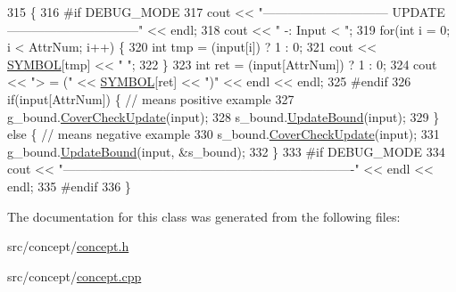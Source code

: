 \begin{DoxyCode}
315                                                     \{
316 \textcolor{preprocessor}{#if DEBUG\_MODE}
317 \textcolor{preprocessor}{}    cout << \textcolor{stringliteral}{"------------------------------ UPDATE --------------------------------"} << endl;
318     cout << \textcolor{stringliteral}{" -: Input < "};
319     \textcolor{keywordflow}{for}(\textcolor{keywordtype}{int} i = 0; i < AttrNum; i++) \{
320     \textcolor{keywordtype}{int} tmp = (input[i]) ? 1 : 0;
321     cout << \hyperlink{concept_8cpp_a6a0fcd5aed2dc21ce5f79cbe7c3a8e2f}{SYMBOL}[tmp] << \textcolor{stringliteral}{" "};
322     \}
323     \textcolor{keywordtype}{int} ret = (input[AttrNum]) ? 1 : 0;
324     cout << \textcolor{stringliteral}{"> = ("} << \hyperlink{concept_8cpp_a6a0fcd5aed2dc21ce5f79cbe7c3a8e2f}{SYMBOL}[ret] << \textcolor{stringliteral}{")"} << endl << endl;
325 \textcolor{preprocessor}{#endif}
326 \textcolor{preprocessor}{}    \textcolor{keywordflow}{if}(input[AttrNum]) \{    \textcolor{comment}{// means positive example}
327     g\_bound.\hyperlink{class_g___bound_a9344fe22bb13d39a425c5a5b690aace4}{CoverCheckUpdate}(input);
328     s\_bound.\hyperlink{class_s___bound_a1391ba6c3f3fab3fd5fa57ecf8e1e66a}{UpdateBound}(input);
329     \} \textcolor{keywordflow}{else} \{    \textcolor{comment}{// means negative example}
330     s\_bound.\hyperlink{class_s___bound_aee5a88ab73dd09ac42953b6f3545dfe2}{CoverCheckUpdate}(input);
331     g\_bound.\hyperlink{class_g___bound_a8b473f262762ac5b74fdb766ded033aa}{UpdateBound}(input, &s\_bound);
332     \}
333 \textcolor{preprocessor}{#if DEBUG\_MODE}
334 \textcolor{preprocessor}{}    cout << \textcolor{stringliteral}{"----------------------------------------------------------------------"} << endl << endl;
335 \textcolor{preprocessor}{#endif}
336 \textcolor{preprocessor}{}\}
\end{DoxyCode}


The documentation for this class was generated from the following files\-:\begin{DoxyCompactItemize}
\item 
src/concept/\hyperlink{concept_8h}{concept.\-h}\item 
src/concept/\hyperlink{concept_8cpp}{concept.\-cpp}\end{DoxyCompactItemize}
